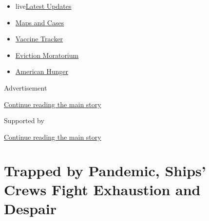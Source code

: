 \begin{itemize}
\tightlist
\item
  live\href{https://www.nytimes3xbfgragh.onion/2020/09/09/world/covid-19-coronavirus.html?name=styln-coronavirus-markets\&region=TOP_BANNER\&block=storyline_menu_recirc\&action=click\&pgtype=Article\&impression_id=04081410-f282-11ea-b183-fd6e653e4bb2\&variant=undefined}{Latest
  Updates}
\item
  \href{https://www.nytimes3xbfgragh.onion/interactive/2020/us/coronavirus-us-cases.html?name=styln-coronavirus-markets\&region=TOP_BANNER\&block=storyline_menu_recirc\&action=click\&pgtype=Article\&impression_id=04081411-f282-11ea-b183-fd6e653e4bb2\&variant=undefined}{Maps
  and Cases}
\item
  \href{https://www.nytimes3xbfgragh.onion/interactive/2020/science/coronavirus-vaccine-tracker.html?name=styln-coronavirus-markets\&region=TOP_BANNER\&block=storyline_menu_recirc\&action=click\&pgtype=Article\&impression_id=04081412-f282-11ea-b183-fd6e653e4bb2\&variant=undefined}{Vaccine
  Tracker}
\item
  \href{https://www.nytimes3xbfgragh.onion/2020/09/02/your-money/eviction-moratorium-covid.html?name=styln-coronavirus-markets\&region=TOP_BANNER\&block=storyline_menu_recirc\&action=click\&pgtype=Article\&impression_id=04081413-f282-11ea-b183-fd6e653e4bb2\&variant=undefined}{Eviction
  Moratorium}
\item
  \href{https://www.nytimes3xbfgragh.onion/interactive/2020/09/02/magazine/food-insecurity-hunger-us.html?name=styln-coronavirus-markets\&region=TOP_BANNER\&block=storyline_menu_recirc\&action=click\&pgtype=Article\&impression_id=04081414-f282-11ea-b183-fd6e653e4bb2\&variant=undefined}{American
  Hunger}
\end{itemize}

Advertisement

\protect\hyperlink{after-top}{Continue reading the main story}

Supported by

\protect\hyperlink{after-sponsor}{Continue reading the main story}

\hypertarget{trapped-by-pandemic-ships-crews-fight-exhaustion-and-despair}{%
\section{Trapped by Pandemic, Ships' Crews Fight Exhaustion and
Despair}\label{trapped-by-pandemic-ships-crews-fight-exhaustion-and-despair}}

